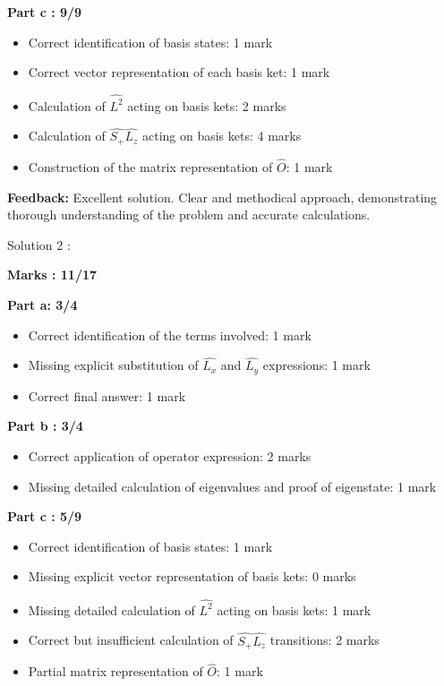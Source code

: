 \documentclass[a4paper,11pt]{article}
\begin{document}
\textbf{Part c : 9/9}
\begin{itemize}
    \item Correct identification of basis states: 1 mark
    \item Correct vector representation of each basis ket: 1 mark
    \item Calculation of $\hat{L^2}$ acting on basis kets: 2 marks
    \item Calculation of $\hat{S_+}\hat{L_z}$ acting on basis kets: 4 marks
    \item Construction of the matrix representation of $\hat{O}$: 1 mark
\end{itemize}

\textbf{Feedback:}
Excellent solution. Clear and methodical approach, demonstrating thorough understanding of the problem and accurate calculations.


Solution 2 :

\textbf{Marks : 11/17}

\textbf{Part a: 3/4}
\begin{itemize}
    \item Correct identification of the terms involved: 1 mark
    \item Missing explicit substitution of $\hat{L_x}$ and $\hat{L_y}$ expressions: 1 mark
    \item Correct final answer: 1 mark
\end{itemize}


\textbf{Part b : 3/4}
\begin{itemize}
    \item Correct application of operator expression: 2 marks
    \item Missing detailed calculation of eigenvalues and proof of eigenstate: 1 mark
\end{itemize}


\textbf{Part c : 5/9}
\begin{itemize}
    \item Correct identification of basis states: 1 mark
    \item Missing explicit vector representation of basis kets: 0 marks
    \item Missing detailed calculation of $\hat{L^2}$ acting on basis kets: 1 mark
    \item Correct but insufficient calculation of $\hat{S_+}\hat{L_z}$ transitions: 2 marks
    \item Partial matrix representation of $\hat{O}$: 1 mark
\end{itemize}
\end{document}
